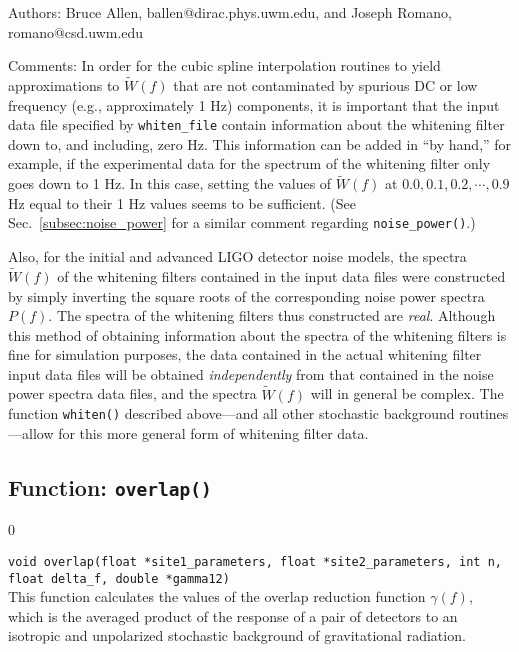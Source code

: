 \begin{description}
\item{Authors:}
Bruce Allen, ballen@dirac.phys.uwm.edu, and Joseph Romano, romano@csd.uwm.edu
\item{Comments:}
In order for the cubic spline interpolation routines to 
yield approximations to $\tilde W(f)$ that are not contaminated by spurious 
DC or low frequency (e.g., approximately 1 Hz) components, it is important 
that the input data file specified by {\tt whiten\_file} contain information 
about the whitening filter down to, and including, zero Hz.
This information can be added in ``by hand,'' for example, if the 
experimental data for the spectrum of the whitening filter only goes down 
to 1 Hz.
In this case, setting the values of $\tilde W(f)$ at 
$0.0, 0.1, 0.2, \cdots, 0.9$ Hz equal to their 1 Hz values seems to be 
sufficient.
(See Sec.~\ref{subsec:noise_power} for a similar comment regarding
{\tt noise\_power()}.)

Also, for the initial and advanced LIGO detector noise models, the
spectra $\tilde W(f)$ of the whitening filters contained in the input
data files were constructed by simply inverting the square roots 
of the corresponding noise power spectra $P(f)$.
The spectra of the whitening filters thus constructed are {\it real}.
Although this method of obtaining information about the spectra of the 
whitening filters is fine for simulation purposes, the data contained 
in the actual whitening filter input data files will be obtained 
{\it independently} from that contained in the noise power spectra data 
files, and the spectra $\tilde W(f)$ will in general be complex.
The function {\tt whiten()} described above---and all other
stochastic background routines---allow for this more general form of 
whitening filter data.
\end{description}
\clearpage

\subsection{Function: {\tt overlap()}}
\label{subsec:overlap}
\setcounter{equation}0

{\tt void overlap(float *site1\_parameters, float *site2\_parameters,
int n, float delta\_f, double *gamma12)}\\
%
This function calculates the values of the overlap reduction function 
$\gamma(f)$, which is the averaged product of the response of a pair
of detectors to an isotropic and unpolarized stochastic background of 
gravitational radiation.

